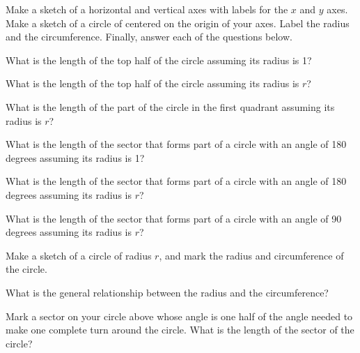 \begin{problem}
\item Make a sketch of a horizontal and vertical axes with labels for
  the $x$ and $y$ axes. Make a sketch of a circle of centered on the
  origin of your axes. Label the radius and the
  circumference. Finally, answer each of the questions below.

  \vfill

  \begin{subproblem}
    \item What is the length of the top half of the circle assuming
      its radius is 1?
      \vspace{3em}
    \item What is the length of the top half of the circle assuming
      its radius is $r$?
      \vspace{3em}
    \item What is the length of the part of the circle in the first
      quadrant assuming its radius is $r$?
      \vspace{3em}

    \item What is the length of the sector that forms part of a circle
      with an angle of 180 degrees assuming its radius is 1?
      \vspace{3em}
    \item What is the length of the sector that forms part of a circle
      with an angle of 180 degrees assuming its radius is $r$?
      \vspace{3em}
    \item What is the length of the sector that forms part of a circle
      with an angle of 90 degrees assuming its radius is $r$?
      \vspace{3em}

  \end{subproblem}

  \clearpage

\item Make a sketch of a circle of radius $r$, and mark the radius and
  circumference of the circle.
  \vfill

  \begin{subproblem}
  \item What is the general relationship between the radius and the
    circumference?
    \vspace{4em}

  \item Mark a sector on your circle above whose angle is one half of
    the angle needed to make one complete turn around the circle. What
    is the length of the sector of the circle?  



\end{subproblem}
\end{problem}
